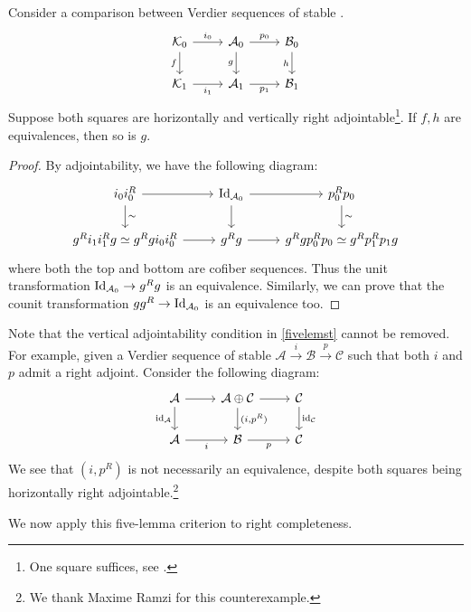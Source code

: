\documentclass[a4paper,10pt, oneside]{amsart}
\begin{document}
	\begin{lem}\label{fivelemst}
		Consider a comparison between Verdier sequences of stable \infcats.
		$$\begin{tikzcd}
			\mathcal{K}_0 \arrow[r, "i_0"] \arrow[d, "f"'] 
			& \mathcal{A}_0 \arrow[r, "p_0"] \arrow[d, "g"'] 
			& \mathcal{B}_0 \arrow[d, "h"'] \\
			\mathcal{K}_1 \arrow[r, "i_1"'] 
			& \mathcal{A}_1 \arrow[r, "p_1"'] 
			& \mathcal{B}_1
		\end{tikzcd}
		$$
		Suppose both squares are horizontally and vertically right adjointable\footnote{One square suffices, see \cite[Proposition A.16]{ramzi2024dualizable}.}. If $f,h$ are equivalences, then so is $g$.
	\end{lem}
	\begin{proof}
		By adjointability, we have the following diagram:
		$$\begin{tikzcd}
			i_0i_0^R \arrow[r] \arrow[d, "\sim"] & \op{Id}_{\mca_0} \arrow[r] \arrow[d] & p_0^Rp_0 \arrow[d, "\sim"] \\
			g^Ri_1i_1^Rg\simeq g^Rgi_0i_0^R \arrow[r]               & g^Rg \arrow[r]                       & g^Rgp_0^Rp_0 \simeq g^R   p_1^Rp_1g           
		\end{tikzcd}$$
		where both the top and bottom are cofiber sequences.
		Thus the unit transformation $\mathrm{Id}_{\mathcal{A}_0}\to g^Rg$ is an equivalence. Similarly, we can prove that the counit transformation $ gg^R\to\mathrm{Id}_{\mathcal{A}_0}$ is an equivalence too.
	\end{proof}

	
\begin{rem}
	
	Note that the vertical adjointability condition in \cref{fivelemst} cannot be removed. For example, given a Verdier sequence of stable \infcats $\mathcal{A} \xrightarrow{i} \mathcal{B} \xrightarrow{p} \mathcal{C}$ such that both $i$ and $p$ admit a right adjoint. Consider the following diagram:
	\[
	\begin{tikzcd}
		\mca \arrow[r] \arrow[d, "\mathrm{id}_{\mathcal{A}}"'] & \mathcal{A} \oplus \mathcal{C} \arrow[r] \arrow[d, "{(i, p^R)}"] & \mathcal{C} \arrow[d, "\mathrm{id}_{\mathcal{C}}"] \\
		\mathcal{A} \arrow[r, "i"']                            & \mcb \arrow[r, "p"']                                             & \mathcal{C}                                       
	\end{tikzcd}
	\]
We see that $(i, p^R)$ is not necessarily an equivalence, despite both squares being horizontally right adjointable.\footnote{We thank Maxime Ramzi for this counterexample.}
\end{rem}
We now apply this five-lemma criterion to right completeness. 
\end{document}
